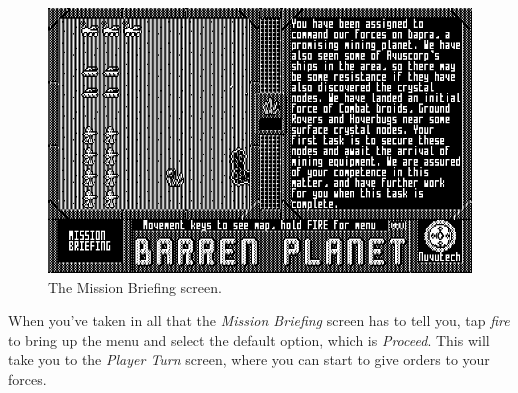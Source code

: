 \begin{figure}[h]
  \includegraphics[width=\textwidth]{mission-briefing}
  \caption{The Mission Briefing screen.}
\end{figure}

When you've taken in all that the {\it Mission Briefing} screen has to tell you, tap {\it fire} to bring up the menu and select the default option, which is {\it Proceed}. This will take you to the {\it Player Turn} screen, where you can start to give orders to your forces.
